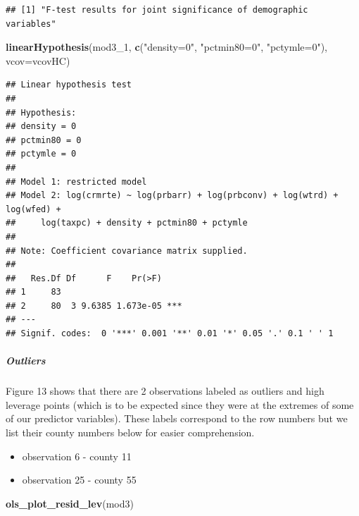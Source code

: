 \documentclass[]{article}
\newenvironment{Shaded}{\begin{snugshade}}{\end{snugshade}}
\newcommand{\DataTypeTok}[1]{\textcolor[rgb]{0.13,0.29,0.53}{#1}}
\newcommand{\DecValTok}[1]{\textcolor[rgb]{0.00,0.00,0.81}{#1}}
\newcommand{\KeywordTok}[1]{\textcolor[rgb]{0.13,0.29,0.53}{\textbf{#1}}}
\newcommand{\NormalTok}[1]{#1}
\newcommand{\StringTok}[1]{\textcolor[rgb]{0.31,0.60,0.02}{#1}}
\providecommand{\tightlist}{%
  \setlength{\itemsep}{0pt}\setlength{\parskip}{0pt}}
\let\oldsubparagraph\subparagraph
\renewcommand{\subparagraph}[1]{\oldsubparagraph{#1}\mbox{}}
\begin{document}
\begin{verbatim}
## [1] "F-test results for joint significance of demographic variables"
\end{verbatim}

\begin{Shaded}
\begin{Highlighting}[]
\KeywordTok{linearHypothesis}\NormalTok{(mod3_}\DecValTok{1}\NormalTok{, }\KeywordTok{c}\NormalTok{(}\StringTok{"density=0"}\NormalTok{, }\StringTok{"pctmin80=0"}\NormalTok{, }\StringTok{"pctymle=0"}\NormalTok{), }\DataTypeTok{vcov=}\NormalTok{vcovHC)}
\end{Highlighting}
\end{Shaded}

\begin{verbatim}
## Linear hypothesis test
## 
## Hypothesis:
## density = 0
## pctmin80 = 0
## pctymle = 0
## 
## Model 1: restricted model
## Model 2: log(crmrte) ~ log(prbarr) + log(prbconv) + log(wtrd) + log(wfed) + 
##     log(taxpc) + density + pctmin80 + pctymle
## 
## Note: Coefficient covariance matrix supplied.
## 
##   Res.Df Df      F    Pr(>F)    
## 1     83                        
## 2     80  3 9.6385 1.673e-05 ***
## ---
## Signif. codes:  0 '***' 0.001 '**' 0.01 '*' 0.05 '.' 0.1 ' ' 1
\end{verbatim}

\hypertarget{outliers}{%
\subparagraph{Outliers}\label{outliers}}

Figure 13 shows that there are 2 observations labeled as outliers and
high leverage points (which is to be expected since they were at the
extremes of some of our predictor variables). These labels correspond to
the row numbers but we list their county numbers below for easier
comprehension.

\begin{itemize}
\tightlist
\item
  observation 6 - county 11
\item
  observation 25 - county 55
\end{itemize}

\begin{Shaded}
\begin{Highlighting}[]
\KeywordTok{ols_plot_resid_lev}\NormalTok{(mod3)}
\end{Highlighting}
\end{Shaded}
\end{document}
